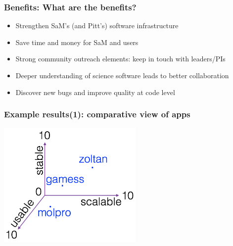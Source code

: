 \documentclass[hyperref={pdfpagelabels=false},12pt]{beamer}
\begin{document}
\begin{frame}
\frametitle{Benefits: What are the benefits?}
\begin{itemize}
\itemsep1em
\item Strengthen SaM's (and Pitt's) software infrastructure
\item
Save time and money for SaM and users
\item
Strong community outreach elements: keep in touch with leaders/PIs 
\item
Deeper understanding of science software leads to better collaboration
\item
Discover new bugs and improve quality at code level
\end{itemize}
\end{frame}

\begin{frame}
\frametitle{Example results(1): comparative view of apps}
\includegraphics[width=7cm]{plot_view}
\end{frame}
\end{document}
